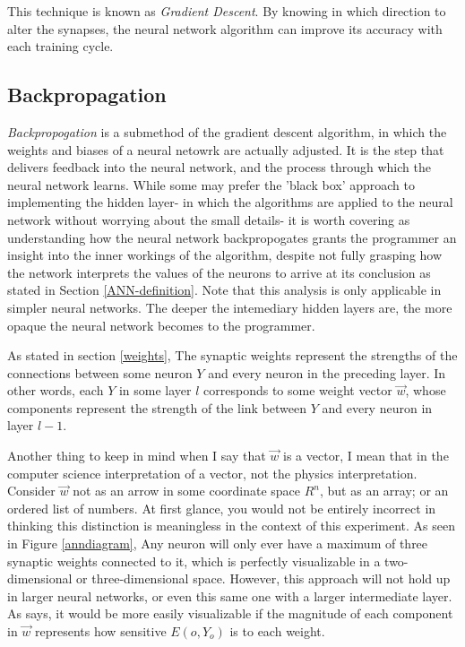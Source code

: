\documentclass[12pt]{article}
\begin{document}
This technique is known as \textit{Gradient Descent}. By knowing in which direction to alter the synapses, the neural network algorithm can improve its accuracy with each training cycle.

\subsection{Backpropagation \label{backprop}}

\textit{Backpropogation} is a submethod of the gradient descent algorithm, in which the weights and biases of a neural netowrk are actually adjusted. It is the step that delivers feedback into the neural network, and the process through which the neural network learns. While some may prefer the 'black box' approach to implementing the hidden layer- in which the algorithms are applied to the neural network without worrying about the small details- it is worth covering as understanding how the neural network backpropogates grants the programmer an insight into the inner workings of the algorithm, despite not fully grasping how the network interprets the values of the neurons to arrive at its conclusion as stated in Section \ref{ANN-definition}. Note that this analysis is only applicable in simpler neural networks. The deeper the intemediary hidden layers are, the more opaque the neural network becomes to the programmer.

As stated in section \ref{weights}, The synaptic weights represent the strengths of the connections between some neuron $Y$ and every neuron in the preceding layer. In other words, each $Y$ in some layer $l$ corresponds to some weight vector $\vec w$, whose components represent the strength of the link between $Y$ and every neuron in layer $l-1$.

Another thing to keep in mind when I say that $\vec w$ is a vector, I mean that in the computer science interpretation of a vector, not the physics interpretation. Consider $\vec{w}$ not as an arrow in some coordinate space $R^n$, but as an array; or an ordered list of numbers. At first glance, you would not be entirely incorrect in thinking this distinction is meaningless in the context of this experiment. As seen in Figure \ref{anndiagram}, Any neuron will only ever have a maximum of three synaptic weights connected to it, which is perfectly visualizable in a two-dimensional or three-dimensional space. However, this approach will not hold up in larger neural networks, or even this same one with a larger intermediate layer. As \textcite{DeepLearningCh3} says, it would be more easily visualizable if the magnitude of each component in $\vec w$ represents how sensitive $E(o, Y_o)$ is to each weight.
\end{document}
